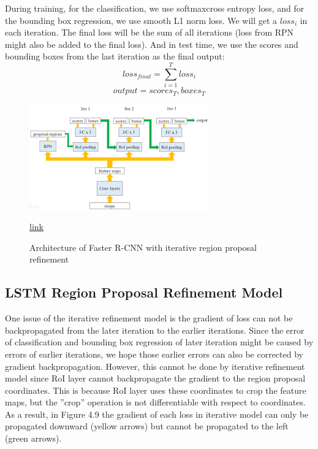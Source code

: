 During training, for the classification, we use softmaxcross entropy loss, and for the bounding box regression, we use smooth L1 norm loss. We will get a $loss_{i}$ in each iteration. The final loss will be the sum of all iterations (loss from RPN might also be added to the final loss). And in test time, we use the scores and bounding boxes from the last iteration as the final output:
\[loss_{final} = \sum_{i=1}^{T} loss_{i}\]
\[output = scores_{T} , boxes_{T}\]
\begin{figure}
	\centering
	\includegraphics[width=\linewidth]{img18}
	\caption{Architecture of Faster R-CNN with iterative region proposal refinement} \href{http://cs231n.stanford.edu/reports/2017/pdfs/112.pdf}{link}
	\label{fig:img18}
\end{figure}


\subsection{LSTM Region Proposal Refinement Model}
One issue of the iterative refinement model is the gradient of loss can not be backpropagated from the later iteration to the earlier iterations. Since the error of classification and bounding box regression of later iteration might be
caused by errors of earlier iterations, we hope those earlier
errors can also be corrected by gradient backpropagation.
However, this cannot be done by iterative refinement model
since RoI layer cannot backpropagate the gradient to the region proposal coordinates. This is because RoI layer uses
these coordinates to crop the feature maps, but the ”crop”
operation is not differentiable with respect to coordinates.
As a result, in Figure 4.9 the gradient of each loss in iterative
model can only be propagated downward (yellow arrows) but cannot be propagated to the left (green arrows).

